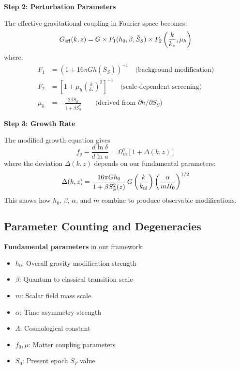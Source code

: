 \documentclass[12pt]{article}
\begin{document}
\textbf{Step 2: Perturbation Parameters}

The effective gravitational coupling in Fourier space becomes:
\begin{equation}
    G_{\rm eff}(k, z) = G \times F_1(h_0, \beta, \bar{S}_S) \times F_2\left( \frac{k}{k_*}, \mu_h \right)
\end{equation}
where:
\begin{align*}
    F_1 &= (1 + 16\pi G h(\bar{S}_S))^{-1} \quad \text{(background modification)}\\
    F_2 &= \left[ 1 + \mu_h \left( \frac{k}{k_*} \right)^2 \right]^{-1} \quad \text{(scale-dependent screening)}\\
    \mu_h &= -\frac{2\beta\bar{S}_S}{1 + \beta \bar{S}_S^2} \qquad \text{(derived from $\partial h/\partial S_S$)}
\end{align*}

\textbf{Step 3: Growth Rate}

The modified growth equation gives
\begin{equation}
    f_g \equiv \frac{d\ln\delta}{d\ln a} = \Omega_m^\gamma \left[ 1 + \Delta(k, z) \right]
\end{equation}
where the deviation $\Delta(k, z)$ depends on our fundamental parameters:
\begin{equation}
    \Delta(k, z) = \frac{16\pi G h_0}{1 + \beta \bar{S}_S^2(z)} \, G\left( \frac{k}{k_{\rm nl}} \right) \left( \frac{\alpha}{m H_0} \right)^{1/2}
\end{equation}
This shows how $h_0$, $\beta$, $\alpha$, and $m$ combine to produce observable modifications.

\subsection{Parameter Counting and Degeneracies}

\textbf{Fundamental parameters} in our framework:
\begin{itemize}
    \item $h_0$: Overall gravity modification strength
    \item $\beta$: Quantum-to-classical transition scale
    \item $m$: Scalar field mass scale
    \item $\alpha$: Time asymmetry strength
    \item $\Lambda$: Cosmological constant
    \item $f_0, \mu$: Matter coupling parameters
    \item $S_0$: Present epoch $S_T$ value
\end{itemize}
\end{document}
